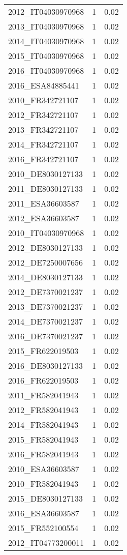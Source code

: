 \begin{table*}[htbp]
\begin{tabular}{lrr}
2012_IT04030970968 & 1 & 0.02 \\
2013_IT04030970968 & 1 & 0.02 \\
2014_IT04030970968 & 1 & 0.02 \\
2015_IT04030970968 & 1 & 0.02 \\
2016_IT04030970968 & 1 & 0.02 \\
2016_ESA84885441 & 1 & 0.02 \\
2010_FR342721107 & 1 & 0.02 \\
2012_FR342721107 & 1 & 0.02 \\
2013_FR342721107 & 1 & 0.02 \\
2014_FR342721107 & 1 & 0.02 \\
2016_FR342721107 & 1 & 0.02 \\
2010_DE8030127133 & 1 & 0.02 \\
2011_DE8030127133 & 1 & 0.02 \\
2011_ESA36603587 & 1 & 0.02 \\
2012_ESA36603587 & 1 & 0.02 \\
2010_IT04030970968 & 1 & 0.02 \\
2012_DE8030127133 & 1 & 0.02 \\
2012_DE7250007656 & 1 & 0.02 \\
2014_DE8030127133 & 1 & 0.02 \\
2012_DE7370021237 & 1 & 0.02 \\
2013_DE7370021237 & 1 & 0.02 \\
2014_DE7370021237 & 1 & 0.02 \\
2016_DE7370021237 & 1 & 0.02 \\
2015_FR622019503 & 1 & 0.02 \\
2016_DE8030127133 & 1 & 0.02 \\
2016_FR622019503 & 1 & 0.02 \\
2011_FR582041943 & 1 & 0.02 \\
2012_FR582041943 & 1 & 0.02 \\
2014_FR582041943 & 1 & 0.02 \\
2015_FR582041943 & 1 & 0.02 \\
2016_FR582041943 & 1 & 0.02 \\
2010_ESA36603587 & 1 & 0.02 \\
2010_FR582041943 & 1 & 0.02 \\
2015_DE8030127133 & 1 & 0.02 \\
2016_ESA36603587 & 1 & 0.02 \\
2015_FR552100554 & 1 & 0.02 \\
2012_IT04773200011 & 1 & 0.02 \\

\end{tabular}
\end{table*}
